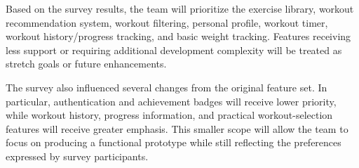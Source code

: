 \documentclass[11pt]{article}
\begin{document}
Based on the survey results, the team will prioritize the exercise library, workout recommendation system, workout filtering, personal profile, workout timer, workout history/progress tracking, and basic weight tracking. Features receiving less support or requiring additional development complexity will be treated as stretch goals or future enhancements.

The survey also influenced several changes from the original feature set. In particular, authentication and achievement badges will receive lower priority, while workout history, progress information, and practical workout-selection features will receive greater emphasis. This smaller scope will allow the team to focus on producing a functional prototype while still reflecting the preferences expressed by survey participants.



\end{document}
